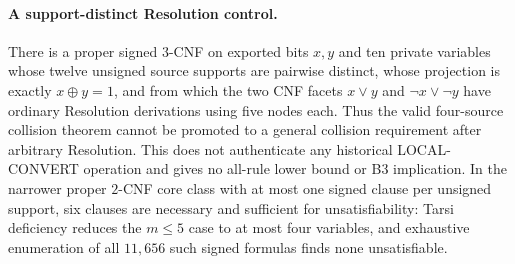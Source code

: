 \paragraph{A support-distinct Resolution control.}
There is a proper signed $3$-CNF on exported bits $x,y$ and ten private
variables whose twelve unsigned source supports are pairwise distinct, whose
projection is exactly $x\oplus y=1$, and from which the two CNF facets
$x\lor y$ and $\neg x\lor\neg y$ have ordinary Resolution derivations using
five nodes each.  Thus the valid four-source collision theorem cannot be
promoted to a general collision requirement after arbitrary Resolution.
This does not authenticate any historical LOCAL-CONVERT operation and gives
no all-rule lower bound or B3 implication.  In the narrower proper $2$-CNF
core class with at most one signed clause per unsigned support, six clauses
are necessary and sufficient for unsatisfiability: Tarsi deficiency reduces
the $m\leq5$ case to at most four variables, and exhaustive enumeration of
all $11{,}656$ such signed formulas finds none unsatisfiable.
